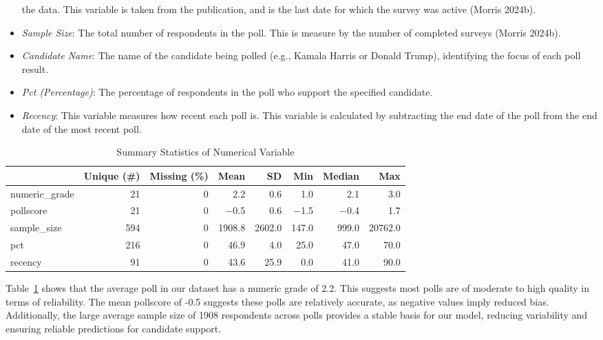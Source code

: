 \documentclass[
  letterpaper,
  DIV=11,
  numbers=noendperiod]{scrartcl}
\begin{document}
\begin{itemize}
  the data. This variable is taken from the publication, and is the last
  date for which the survey was active (Morris 2024b).
\item
  \emph{Sample Size}: The total number of respondents in the poll. This
  is measure by the number of completed surveys (Morris 2024b).
\item
  \emph{Candidate Name}: The name of the candidate being polled (e.g.,
  Kamala Harris or Donald Trump), identifying the focus of each poll
  result.
\item
  \emph{Pct (Percentage)}: The percentage of respondents in the poll who
  support the specified candidate.
\item
  \emph{Recency}: This variable measures how recent each poll is. This
  variable is calculated by subtracting the end date of the poll from
  the end date of the most recent poll.
\end{itemize}

\newpage

\hypertarget{tbl-sumstat}{}
\begin{table}
\caption{\label{tbl-sumstat}Summary Statistics of Numerical Variable }\tabularnewline

\centering
\begin{tabular}[t]{lrrrrrrr}
\toprule
  & Unique (\#) & Missing (\%) & Mean & SD & Min & Median & Max\\
\midrule
numeric\_grade & 21 & 0 & \num{2.2} & \num{0.6} & \num{1.0} & \num{2.1} & \num{3.0}\\
pollscore & 21 & 0 & \num{-0.5} & \num{0.6} & \num{-1.5} & \num{-0.4} & \num{1.7}\\
sample\_size & 594 & 0 & \num{1908.8} & \num{2602.0} & \num{147.0} & \num{999.0} & \num{20762.0}\\
pct & 216 & 0 & \num{46.9} & \num{4.0} & \num{25.0} & \num{47.0} & \num{70.0}\\
recency & 91 & 0 & \num{43.6} & \num{25.9} & \num{0.0} & \num{41.0} & \num{90.0}\\
\bottomrule
\end{tabular}
\end{table}

\vspace{0.7cm}

Table~\ref{tbl-sumstat} shows that the average poll in our dataset has a
numeric grade of 2.2. This suggests most polls are of moderate to high
quality in terms of reliability. The mean pollscore of -0.5 suggests
these polls are relatively accurate, as negative values imply reduced
bias. Additionally, the large average sample size of 1908 respondents
across polls provides a stable basis for our model, reducing variability
and ensuring reliable predictions for candidate support.
\end{document}
